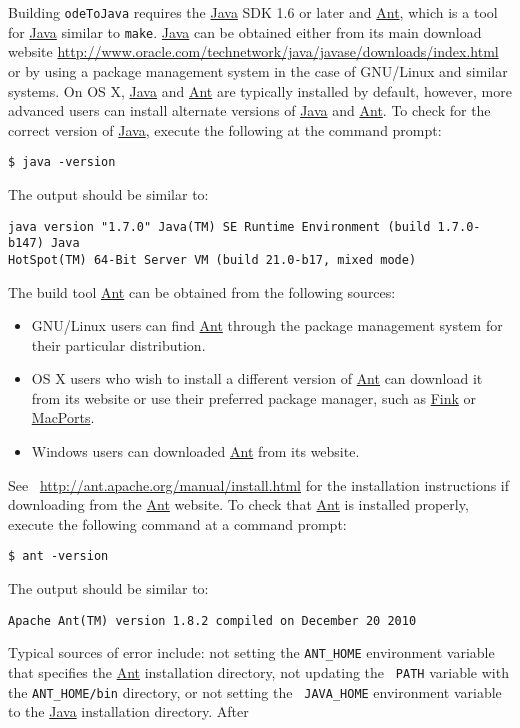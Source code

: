 \documentclass[10pt,letterpaper]{article}
\newcommand\Ant{\href{http://ant.apache.org/}{\sc Ant}}
\newcommand\Java{\href{http://www.java.com/en/about/}{\sc Java}}
\newcommand\odj{{\tt odeToJava}}
\begin{document}
Building \odj{} requires the \Java{} SDK 1.6 or later and \Ant, which is a tool
for \Java{} similar to {\tt make}. \Java{} can be obtained either from its main
download website
\url{http://www.oracle.com/technetwork/java/javase/downloads/index.html} or by
using a package management system in the case of GNU/Linux and similar systems.
On OS X, \Java{} and \Ant{} are typically installed by default, however, more
advanced users can install alternate versions of \Java{} and \Ant. To check for
the correct version of \Java, execute the following at the command prompt:
\begin{verbatim}
$ java -version
\end{verbatim}
The output should be similar to:
\begin{verbatim}
java version "1.7.0" Java(TM) SE Runtime Environment (build 1.7.0-b147) Java
HotSpot(TM) 64-Bit Server VM (build 21.0-b17, mixed mode)
\end{verbatim}
The build tool \Ant{} can be obtained from the following sources:
\begin{itemize}
  \item GNU/Linux users can find \Ant{} through the package management system for their
    particular distribution.
  \item OS X users who wish to install a different version of \Ant{} can download
    it from its website or use their preferred package manager, such as
    \href{http://finkproject.org/}{Fink} or \href{http://www.macports.org/}{MacPorts}.
  \item Windows users can downloaded \Ant{} from its website.
\end{itemize}
See~ \url{http://ant.apache.org/manual/install.html} for the installation
instructions if downloading from the \Ant{} website. To check that \Ant{} is
installed properly, execute the following command at a command prompt:
\begin{verbatim}
$ ant -version
\end{verbatim}
The output should be similar to:
\begin{verbatim}
Apache Ant(TM) version 1.8.2 compiled on December 20 2010
\end{verbatim}
Typical sources of error include: not setting the {\tt ANT\_HOME} environment
variable that specifies the \Ant{} installation directory, not updating the {\tt
PATH} variable with the {\tt ANT\_HOME/bin} directory, or not setting the {\tt
JAVA\_HOME} environment variable to the \Java{} installation directory. After
\end{document}
